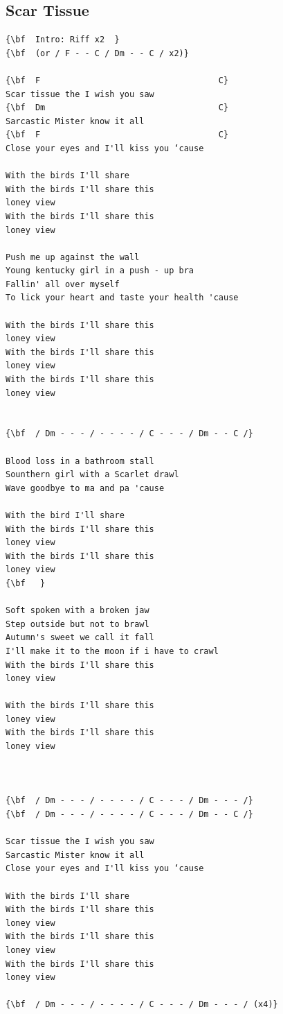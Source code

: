 \documentclass[a4paper]{article}
\begin{document}
\subsection{Scar Tissue}
\begin{Verbatim}[commandchars=\\\{\}]
{\bf  Intro: Riff x2  }
{\bf  (or / F - - C / Dm - - C / x2)}

{\bf  F                                    C}
Scar tissue the I wish you saw
{\bf  Dm                                   C}
Sarcastic Mister know it all
{\bf  F                                    C}
Close your eyes and I'll kiss you ‘cause

With the birds I'll share
With the birds I'll share this
loney view
With the birds I'll share this
loney view

Push me up against the wall
Young kentucky girl in a push - up bra
Fallin' all over myself
To lick your heart and taste your health 'cause

With the birds I'll share this
loney view
With the birds I'll share this
loney view
With the birds I'll share this
loney view


{\bf  / Dm - - - / - - - - / C - - - / Dm - - C /}

Blood loss in a bathroom stall
Sounthern girl with a Scarlet drawl
Wave goodbye to ma and pa 'cause

With the bird I'll share
With the birds I'll share this
loney view
With the birds I'll share this
loney view
{\bf   }

Soft spoken with a broken jaw
Step outside but not to brawl
Autumn's sweet we call it fall
I'll make it to the moon if i have to crawl
With the birds I'll share this
loney view

With the birds I'll share this
loney view
With the birds I'll share this
loney view



{\bf  / Dm - - - / - - - - / C - - - / Dm - - - /}
{\bf  / Dm - - - / - - - - / C - - - / Dm - - C /}

Scar tissue the I wish you saw
Sarcastic Mister know it all
Close your eyes and I'll kiss you ‘cause

With the birds I'll share
With the birds I'll share this
loney view
With the birds I'll share this
loney view
With the birds I'll share this
loney view

{\bf  / Dm - - - / - - - - / C - - - / Dm - - - / (x4)}

\end{Verbatim}
\newpage
\end{document}

